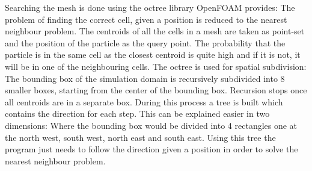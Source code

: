 Searching the mesh is done using the octree library \cite{octree} OpenFOAM provides: The problem of finding the correct cell, given a position is reduced to the nearest neighbour problem. The centroids of all the cells in a mesh are taken as point-set and the position of the particle as the query point. The probability that the particle is in the same cell as the closest centroid is quite high and if it is not, it will be in one of the neighbouring cells. The octree is used for spatial subdivision: The bounding box of the simulation domain is recursively subdivided into 8 smaller boxes, starting from the center of the bounding box. Recursion stops once all centroids are in a separate box. During this process a tree is built which contains the direction for each step. This can be explained easier in two dimensions: Where the bounding box would be divided into 4 rectangles one at the north west, south west, north east and south east. Using this tree the program just needs to follow the direction given a position in order to solve the nearest neighbour problem.